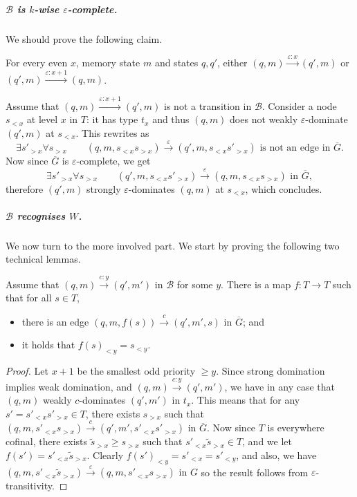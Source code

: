 \documentclass[a4paper,UKenglish,cleveref, thm-restate]{lipics-v2021}
\newcommand{\re}[1]{\xrightarrow{#1}}
\newcommand{\tin}{\text{ in }}
\newcommand{\eps}{\varepsilon}
\newcommand{\B}{\mathcal B}
\begin{document}
\subparagraph*{$\B$ is $k$-wise $\eps$-complete.}

We should prove the following claim.

\begin{claim}
    For every even $x$, memory state $m$ and states $q,q'$, either $(q,m) \re{\eps:x} (q',m)$ or $(q',m) \re{\eps:x+1} (q,m)$.
\end{claim}

\begin{claimproof}
    Assume that $(q,m) \re{\eps:x+1} (q',m)$ is not a transition in $\B$.
    Consider a node $s_{<x}$ at level $x$ in $T$: it has type $t_x$ and thus $(q,m)$ does not weakly $\eps$-dominate $(q',m)$ at $s_{<x}$.
    This rewrites as
    \[
        \exists s'_{> x} \forall s_{> x} \qquad (q,m,s_{< x} s_{>x}) \re \eps (q',m,s_{< x} s'_{>x}) \text{ is not an edge in } \overline G.
    \]
    Now since $\overline G$ is $\eps$-complete, we get 
    \[
        \exists s'_{> x} \forall s_{> x} \qquad (q',m,s_{< x} s'_{>x}) \re \eps (q,m,s_{< x} s_{>x}) \tin \overline G,
    \]
    therefore $(q',m)$ strongly $\eps$-dominates $(q,m)$ at $s_{<x}$, which concludes.
\end{claimproof}


\subparagraph*{$\B$ recognises $W$.}

We now turn to the more involved part.
We start by proving the following two technical lemmas.

\begin{lemma}\label{lem:technical1}
Assume that $(q,m) \re{c:y} (q',m') \tin \B$ for some $y$.
There is a map $f:T \to T$ such that for all $s \in T$, 
\begin{itemize}
    \item there is an edge $(q,m,f(s)) \re c (q',m',s)$ in $\overline G$; and
    \item it holds that $f(s)_{< y} = s_{< y}$.
\end{itemize}
\end{lemma}

\begin{proof}
Let $x+1$ be the smallest odd priority $\geq y$.
Since strong domination implies weak domination, and $(q,m) \re{c:y} (q',m')$, we have in any case that $(q,m)$ weakly $c$-dominates $(q',m')$ in $t_{x}$.
This means that for any $s'=s'_{< x}s'_{> x} \in T$, there exists $s_{> x}$ such that $(q,m,s'_{< x}s_{> x}) \re c (q',m',s'_{< x}s'_{> x}) \tin \overline G$.
Now since $T$ is everywhere cofinal, there exists $\tilde s_{> x} \geq s_{> x}$ such that $s'_{<x}\tilde s_{> x} \in T$, and we let $f(s')=s'_{<x}\tilde s_{> x}$.
Clearly $f(s')_{< y} = s'_{< x} = s'_{< y}$, and also, we have $(q,m,s'_{<x}\tilde s_{> x} ) \re \eps (q,m,s'_{<x}s_{> x})\tin G$ so the result follows from $\eps$-transitivity.
\end{proof}
\end{document}
